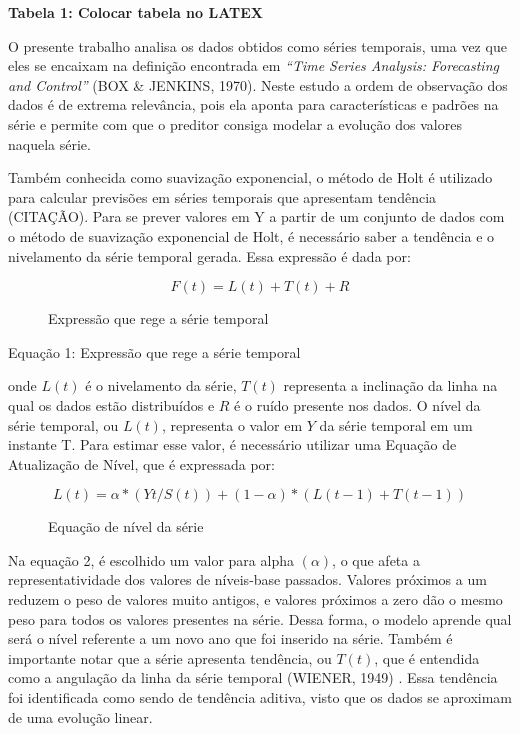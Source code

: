 \textbf{Tabela 1: Colocar tabela no LATEX}

O presente trabalho analisa os dados obtidos como séries temporais, 
uma vez que eles se encaixam na definição encontrada em 
\emph{“Time Series Analysis: Forecasting and Control”} 
(BOX \& JENKINS, 1970). Neste estudo a ordem de observação dos dados 
é de extrema relevância, pois ela aponta para características 
e padrões na série e permite com que o preditor consiga modelar 
a evolução dos valores naquela série.

Também conhecida como suavização exponencial, o método de Holt é 
utilizado para calcular previsões em séries temporais que apresentam 
tendência (CITAÇÃO). Para se prever valores em Y a partir de um 
conjunto de dados com o método de suavização exponencial de Holt, 
é necessário saber a tendência e o nivelamento da série temporal 
gerada. Essa expressão é dada por:

\begin{figure}[h!]
    \begin{equation}
        F(t) = L(t) + T(t) + R
    \end{equation}
    \caption{Expressão que rege a série temporal}
\end{figure}

Equação 1: Expressão que rege a série temporal

onde $L(t)$ é o nivelamento da série, $T(t)$ 
representa a inclinação da linha na qual os dados estão 
distribuídos e $R$ é o ruído presente nos dados. 
O nível da série temporal, ou $L(t)$, representa o valor 
em $Y$ da série temporal em um instante T. Para estimar 
esse valor, é necessário utilizar uma Equação de Atualização 
de Nível, que é expressada por: 

\begin{figure}[h!]
    \begin{equation}
        L(t) = \alpha * (Yt / S(t)) + (1 - \alpha) * (L(t-1) + T(t-1))
    \end{equation}
    \caption{Equação de nível da série}
\end{figure}



Na equação 2, é escolhido um valor para alpha $(\alpha)$, o 
que afeta a representatividade dos valores de níveis-base 
passados. Valores próximos a um reduzem o peso de valores 
muito antigos, e valores próximos a zero dão o mesmo peso 
para todos os valores presentes na série. Dessa forma, 
o modelo aprende qual será o nível referente a um novo 
ano que foi inserido na série. Também é importante 
notar que a série apresenta tendência, ou $T(t)$, que 
é entendida como a angulação da linha da série temporal (WIENER, 1949)
. Essa tendência foi identificada como sendo de tendência 
aditiva, visto que os dados se aproximam de uma evolução linear.

